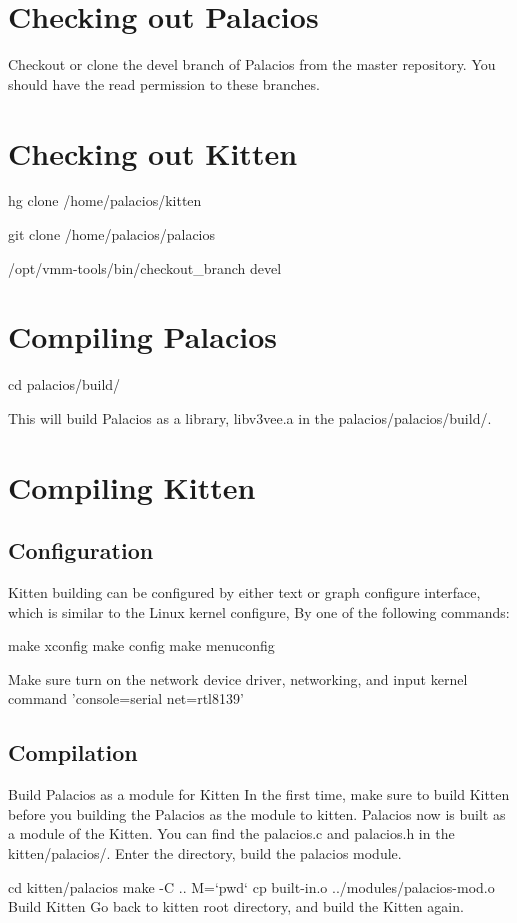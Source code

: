 \documentclass[11pt]{article}
\begin{document}
\section{Checking out Palacios}

Checkout or clone the devel branch of Palacios from the master
repository. You should have the read permission to these branches.


\section{Checking out Kitten}

hg clone /home/palacios/kitten

git clone /home/palacios/palacios

/opt/vmm-tools/bin/checkout\_branch devel


\section{Compiling Palacios}
cd palacios/build/


This will build Palacios as a library, libv3vee.a in the palacios/palacios/build/.


\section{Compiling Kitten}
\subsection{Configuration}
Kitten building can be configured by either text or graph configure interface, which is similar to the Linux kernel configure, By one of the following commands:

make xconfig
make config
make menuconfig

Make sure turn on the network device driver, networking, and input kernel command 'console=serial net=rtl8139'
\subsection{Compilation}

Build Palacios as a module for Kitten
In the first time, make sure to build Kitten before you building the Palacios as the module to kitten. 
Palacios now is built as a module of the Kitten. You can find the palacios.c and palacios.h in the kitten/palacios/. Enter the directory, build the palacios module.

cd kitten/palacios
make -C .. M=`pwd`
cp built-in.o ../modules/palacios-mod.o
Build Kitten
Go back to kitten root directory, and build the Kitten again.
\end{document}
